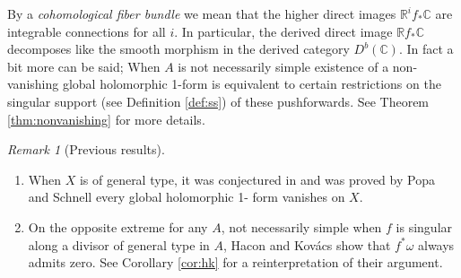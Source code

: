 \documentclass[11pt,reqno]{amsart}
\theoremstyle{definition}
\theoremstyle{remark}
\newtheorem{remark}[theorem]{Remark}
\theoremstyle{cited}
\theoremstyle{citeddef}
\newcommand{\bbC}{\mathbb{C}}
\newcommand{\bbR}{\mathbb{R}}
\begin{document}
By a \textsl{cohomological fiber bundle} we mean that the higher direct
images $\bbR^if_*\bbC$ are integrable connections for all $i$. In particular, the derived direct image
$\bbR f_*\bbC$ decomposes like the smooth morphism in the derived category $D^b(\bbC)$. In fact a bit more can be said; When $A$ is not necessarily simple existence of a non-vanishing global holomorphic 1-form
is equivalent to certain restrictions on the singular support 
(see Definition \ref{def:ss}) of 
these pushforwards. See Theorem \ref{thm:nonvanishing} for more details.

\begin{remark}[Previous results]
\begin{enumerate}
\item \label{item:ps} When $X$ is of general type, it was conjectured in
	\cite{HK05, LZ05} and was proved
	by Popa and Schnell \cite{PS14} every global holomorphic 1-		
	form vanishes on $X$. 
\item \label{item:hk} On the opposite extreme for any $A$, not necessarily simple when $f$ is singular along a divisor of general
		type in $A$, Hacon and Kov\'acs \cite[Proposition 3.5.]{HK05} show that
		$f^*\omega$ always admits zero. See Corollary \ref{cor:hk}
		for a reinterpretation of their argument. 
\end{enumerate}	
\end{remark}
\end{document}

